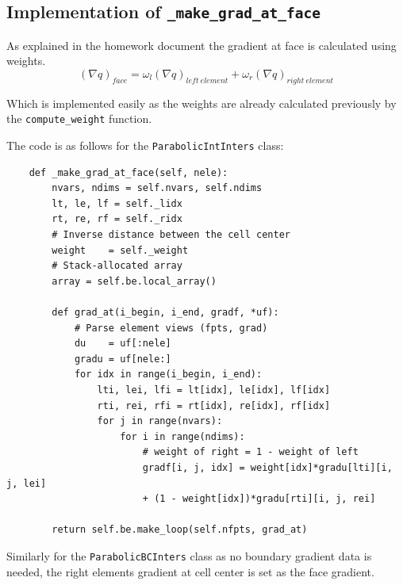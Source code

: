 \documentclass[a4paper, 12pt]{article}
\begin{document}
\subsection{Implementation of \texttt{\_make\_grad\_at\_face}}
As explained in the homework document the gradient at face is calculated using weights. 
\begin{equation}
    (\nabla q)_{face} = \omega_l(\nabla q)_{left\:element} +\omega_r(\nabla q)_{right\:element} 
\end{equation}

Which is implemented easily as the weights are already calculated previously by the \verb|compute_weight| function. \\\par

The code is as follows for the \verb|ParabolicIntInters| class:

\begin{verbatim}
    def _make_grad_at_face(self, nele):
        nvars, ndims = self.nvars, self.ndims
        lt, le, lf = self._lidx
        rt, re, rf = self._ridx    
        # Inverse distance between the cell center
        weight    = self._weight
        # Stack-allocated array
        array = self.be.local_array()

        def grad_at(i_begin, i_end, gradf, *uf):
            # Parse element views (fpts, grad)
            du    = uf[:nele]
            gradu = uf[nele:]
            for idx in range(i_begin, i_end):
                lti, lei, lfi = lt[idx], le[idx], lf[idx]
                rti, rei, rfi = rt[idx], re[idx], rf[idx]
                for j in range(nvars):
                    for i in range(ndims):
                        # weight of right = 1 - weight of left
                        gradf[i, j, idx] = weight[idx]*gradu[lti][i, j, lei] 
                        + (1 - weight[idx])*gradu[rti][i, j, rei]

        return self.be.make_loop(self.nfpts, grad_at)   
\end{verbatim}

Similarly for the \verb|ParabolicBCInters| class as no boundary gradient data is needed, the right elements gradient at cell center is set as the face gradient.
\end{document}
